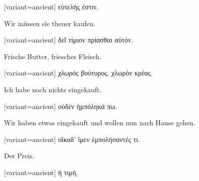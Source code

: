 \switchcolumn

\begin{greek}[variant=ancient]%
εὐτελής ἐστιν.

\end{greek}%
\switchcolumn*

Wir müssen sie theuer kaufen. 

\switchcolumn

\begin{greek}[variant=ancient]%
δεῖ τίμιον πρίασθαι αὐτόν.

\end{greek}%
\switchcolumn*

Frische Butter, friesches Fleisch. 

\switchcolumn

\begin{greek}[variant=ancient]%
\emph{χλωρὸς} βούτυρος, χλωρὸν κρέας.

\end{greek}%
\switchcolumn*

Ich habe noch nichts eingekauft. 

\switchcolumn

\begin{greek}[variant=ancient]%
οὐδὲν ἠμπόληκά πω.

\end{greek}%
\switchcolumn*

Wir haben etwas eingekauft und wollen nun nach Hause gehen. 

\switchcolumn

\begin{greek}[variant=ancient]%
οἴκαδ' ἴμεν ἐμπολήσαντές τι.

\end{greek}%
\switchcolumn*

Der Preis. 

\switchcolumn

\begin{greek}[variant=ancient]%
ἡ τιμή.

\end{greek}%
